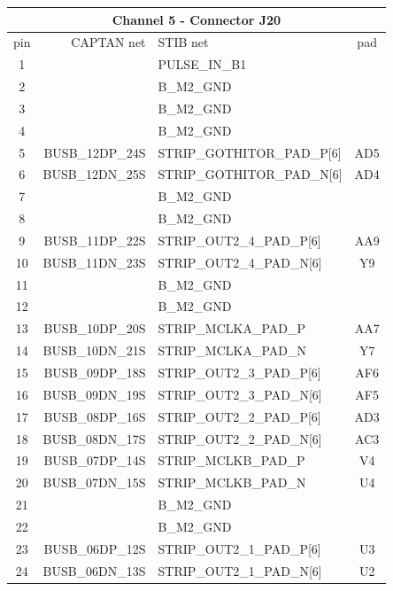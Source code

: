 \documentclass[11pt]{article}
\begin{document}
\begin{table}
\begin{center}
\scriptsize
\begin{tabular}{|c|r|l|c|} \hline
\multicolumn{4}{|c|}{Channel 5 - Connector J20} \\ \hline
pin & CAPTAN net & STIB net & pad \\ \hline\hline
 1 &                & PULSE\_IN\_B1 & \\
 2 &                & B\_M2\_GND & \\ \hline
 3 &                & B\_M2\_GND & \\
 4 &                & B\_M2\_GND & \\ \hline
 5 &  BUSB\_12DP\_24S & STRIP\_GOTHITOR\_PAD\_P[6] & AD5 \\
 6 &  BUSB\_12DN\_25S & STRIP\_GOTHITOR\_PAD\_N[6] &  AD4 \\ \hline
 7 &                & B\_M2\_GND & \\
 8 &                & B\_M2\_GND & \\ \hline
 9 &  BUSB\_11DP\_22S & STRIP\_OUT2\_4\_PAD\_P[6] & AA9 \\
10 &  BUSB\_11DN\_23S & STRIP\_OUT2\_4\_PAD\_N[6] &  Y9 \\ \hline
11 &                & B\_M2\_GND & \\
12 &                & B\_M2\_GND & \\ \hline
13 &  BUSB\_10DP\_20S & STRIP\_MCLKA\_PAD\_P     &   AA7 \\
14 &  BUSB\_10DN\_21S & STRIP\_MCLKA\_PAD\_N     &   Y7 \\ \hline
15 &  BUSB\_09DP\_18S & STRIP\_OUT2\_3\_PAD\_P[6] &   AF6 \\
16 &  BUSB\_09DN\_19S & STRIP\_OUT2\_3\_PAD\_N[6] &   AF5 \\ \hline
17 &  BUSB\_08DP\_16S & STRIP\_OUT2\_2\_PAD\_P[6] &   AD3 \\
18 &  BUSB\_08DN\_17S & STRIP\_OUT2\_2\_PAD\_N[6] &   AC3 \\ \hline
19 &  BUSB\_07DP\_14S & STRIP\_MCLKB\_PAD\_P     &   V4 \\
20 &  BUSB\_07DN\_15S & STRIP\_MCLKB\_PAD\_N     &   U4 \\ \hline
21 &                & B\_M2\_GND & \\
22 &                & B\_M2\_GND & \\ \hline
23 &  BUSB\_06DP\_12S & STRIP\_OUT2\_1\_PAD\_P[6] &   U3 \\
24 &  BUSB\_06DN\_13S & STRIP\_OUT2\_1\_PAD\_N[6] &   U2 \\ \hline

\end{tabular}
\end{center}
\end{table}
\end{document}
